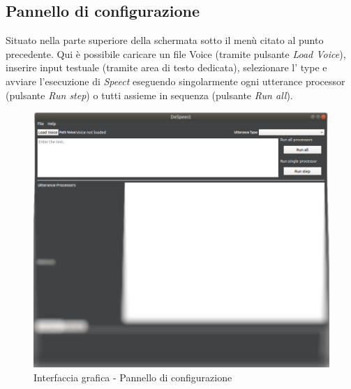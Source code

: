 \documentclass[openany,12pt,a4paper]{report}
\begin{document}
 	\subsection{Pannello di configurazione}
 	Situato nella parte superiore della schermata sotto il menù citato al punto precedente. Qui è possibile caricare un file Voice (tramite pulsante \textit{Load Voice}), inserire input testuale (tramite area di testo dedicata), selezionare l' type e avviare l'esecuzione di \textit{Speect} eseguendo singolarmente ogni utterance processor (pulsante \textit{Run step}) o tutti assieme in sequenza (pulsante \textit{Run all}).
 		\begin{figure}[H]
 			
 			\centering
 			
 			\includegraphics[width=\textwidth]{./img/config-panel}
 			
 			\caption{Interfaccia grafica - Pannello di configurazione}
 			
 		\end{figure}
 	
 	\newpage
 	
\end{document}

